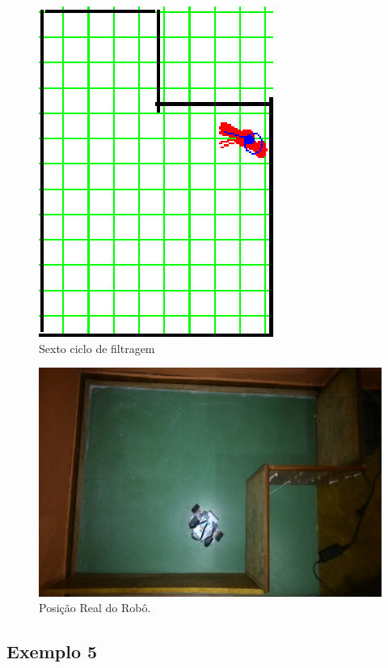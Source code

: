 \begin{figure}[H]
  \centering
  \includegraphics[scale=1]{figuras/cen3_ex4/7.eps}
  \caption[Sexto Ciclo de Filtragem]{Sexto ciclo de filtragem}
  \label{img:cen3_ex4_7}
\end{figure}

\begin{figure}[H]
  \centering
  \includegraphics[scale=1]{figuras/cen3_ex4/real.eps}
  \caption[Posição Real do Robô]{Posição Real do Robô.}
  \label{img:cen3_ex4_real}
\end{figure}


\subsection{Exemplo 5}

